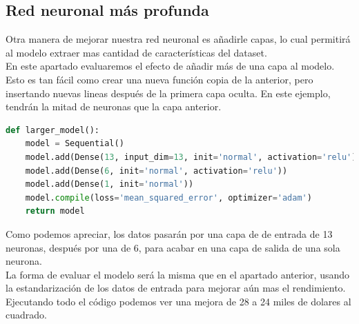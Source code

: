 \subsection{Red neuronal más profunda}
Otra manera de mejorar nuestra red neuronal es añadirle capas, lo cual permitirá al modelo extraer mas cantidad de características del dataset.\\
En este apartado evaluaremos el efecto de añadir más de una capa al modelo. Esto es tan fácil como crear una nueva función copia de la anterior, pero insertando nuevas lineas después de la primera capa oculta. En este ejemplo, tendrán la mitad de neuronas que la capa anterior.
\begin{lstlisting}[language=Python]
def larger_model():
	model = Sequential()
	model.add(Dense(13, input_dim=13, init='normal', activation='relu'))
	model.add(Dense(6, init='normal', activation='relu'))
	model.add(Dense(1, init='normal'))
	model.compile(loss='mean_squared_error', optimizer='adam')
	return model
\end{lstlisting}
Como podemos apreciar, los datos pasarán por una capa de de entrada de 13 neuronas, después por una de 6, para acabar en una capa de salida de una sola neurona.\\
La forma de evaluar el modelo será la misma que en el apartado anterior, usando la estandarización de los datos de entrada para mejorar aún mas el rendimiento.\\
Ejecutando todo el código podemos ver una mejora de 28 a 24 miles de dolares al cuadrado.
